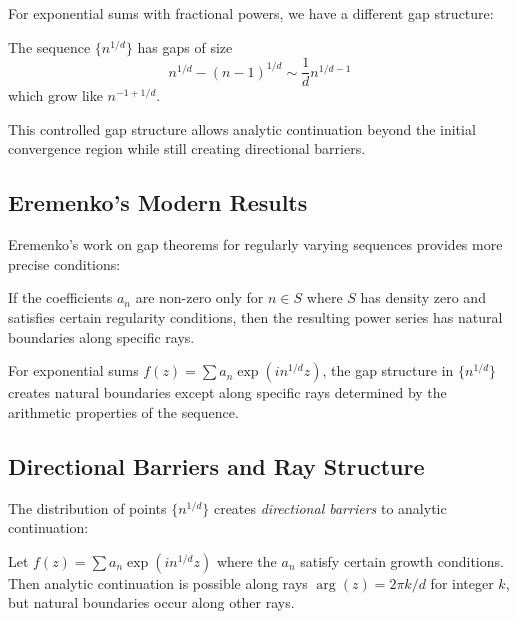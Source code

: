 For exponential sums with fractional powers, we have a different gap structure:

\begin{theorem}
The sequence $\{n^{1/d}\}$ has gaps of size
\begin{equation}
n^{1/d} - (n-1)^{1/d} \sim \frac{1}{d} n^{1/d-1}
\end{equation}
which grow like $n^{-1+1/d}$.
\end{theorem}

This controlled gap structure allows analytic continuation beyond the initial convergence region while still creating directional barriers.

\subsection{Eremenko's Modern Results}

Eremenko's work on gap theorems for regularly varying sequences provides more precise conditions:

\begin{theorem}
If the coefficients $a_n$ are non-zero only for $n \in S$ where $S$ has density zero and satisfies certain regularity conditions, then the resulting power series has natural boundaries along specific rays.
\end{theorem}

\begin{corollary}
For exponential sums $f(z) = \sum a_n \exp(i n^{1/d} z)$, the gap structure in $\{n^{1/d}\}$ creates natural boundaries except along specific rays determined by the arithmetic properties of the sequence.
\end{corollary}

\subsection{Directional Barriers and Ray Structure}

The distribution of points $\{n^{1/d}\}$ creates \emph{directional barriers} to analytic continuation:

\begin{proposition}
Let $f(z) = \sum a_n \exp(i n^{1/d} z)$ where the $a_n$ satisfy certain growth conditions. Then analytic continuation is possible along rays $\arg(z) = 2\pi k/d$ for integer $k$, but natural boundaries occur along other rays.
\end{proposition}

